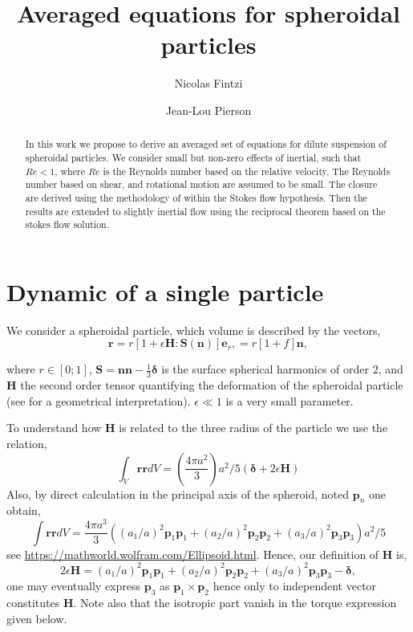 \documentclass[12pt]{My_preprint}
\title{Averaged equations for spheroidal particles  }
\author[1]{Nicolas Fintzi}
\author[1]{Jean-Lou Pierson}
\affil[1]{IFP Energies Nouvelles, Rond-point de l’changeur de Solaize, 69360 Solaize}
\begin{document}
\maketitle

\begin{abstract}
    In this work we propose to derive an averaged set of equations for dilute suspension of spheroidal particles. 
    We consider small but non-zero effects of inertial, such that $Re<1$, where $Re$ is the Reynolds number based on the relative velocity. 
    The Reynolds number based on shear, and rotational motion are assumed to be small.
    The closure are derived using the methodology of \citet{brenner1963resistance} within the Stokes flow hypothesis. 
    Then the results are extended to slightly inertial flow using the reciprocal theorem based on the stokes flow solution. 
\end{abstract}


\section{Dynamic of a single particle}

We consider a spheroidal particle, which volume is described by the vectors, 
\begin{equation}
    \textbf{r} 
    = r [1 + \epsilon \textbf{H}:\textbf{S}(\textbf{n})]\textbf{e}_r,
    = r [1 + f]\textbf{n},
\end{equation}

where $r\in [0;1]$, $\textbf{S} = \textbf{nn} - \frac{1}{3}\bm\delta$ is the surface spherical harmonics of order $2$, and \textbf{H} the second order tensor quantifying the deformation of the spheroidal particle (see \citet{nadim1996concise} for a geometrical interpretation).  
$\epsilon\ll 1$ is a very small parameter. 

To understand how $\textbf{H}$ is related to the three radius of the particle we use the relation, 
\begin{equation}
    \int_{V} \textbf{rr} dV = (\frac{4\pi a^2}{3}) a^2/5(\bm\delta+ 2\epsilon \textbf{H})
\end{equation}
Also, by direct calculation in the principal axis of the spheroid, noted $\textbf{p}_n$ one obtain, 
\begin{equation}
    \int \textbf{rr} dV =  \frac{4\pi a^3}{3} ((a_1/a)^2 \textbf{p}_1 \textbf{p}_1+ (a_2/a)^2\textbf{p}_2 \textbf{p}_2 + (a_3/a)^2\textbf{p}_3 \textbf{p}_3)a^2/5
\end{equation}
see \url{https://mathworld.wolfram.com/Ellipsoid.html}. 
Hence, our definition of \textbf{H} is, 
\begin{equation}
    2\epsilon \textbf{H}= (a_1/a)^2 \textbf{p}_1 \textbf{p}_1+ (a_2/a)^2\textbf{p}_2 \textbf{p}_2 + (a_3/a)^2\textbf{p}_3 \textbf{p}_3 - \bm\delta,
\end{equation}
one may eventually express $\textbf{p}_3$ as $\textbf{p}_1 \times \textbf{p}_2$ hence only to independent vector constitutes $\textbf{H}$. 
Note also that the isotropic part vanish in the torque expression given below. 
\end{document}
